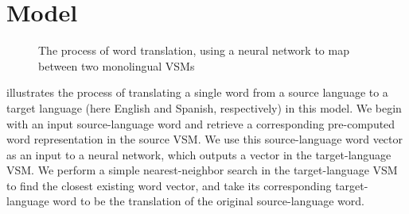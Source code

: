 \documentclass[11pt]{article}
\begin{document}

\section{Model}
\label{sec:model}

\begin{figure}[tb!]
	\centering
    \caption{The process of word translation, using a neural network to map between
        two monolingual VSMs}
    \label{fig:translation}
\end{figure}

 illustrates the process of translating a single word from a source
language to a target language (here English and Spanish, respectively) in this model. We
begin with an input source-language word and retrieve a corresponding pre-computed word
representation in the source VSM. We use this source-language word vector as an input to
a neural network, which outputs a vector in the target-language VSM. We perform a simple
nearest-neighbor search in the target-language VSM to find the closest existing word
vector, and take its corresponding target-language word to be the translation of the
original source-language word.
\end{document}
